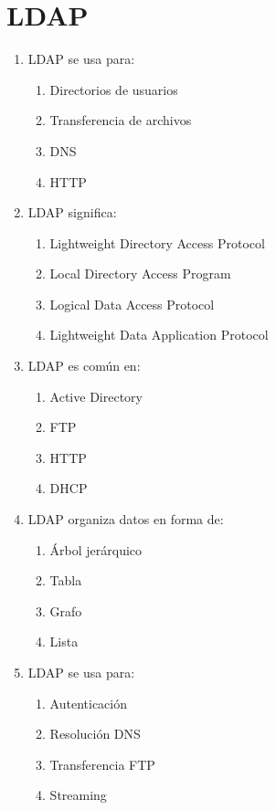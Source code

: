 \documentclass[12pt]{article}
\begin{document}
\section*{LDAP}

\begin{enumerate}[label=\textbf{LDAP-\arabic*.}]

\item LDAP se usa para:
\begin{enumerate}[label=\alph*)]
\item Directorios de usuarios
\item Transferencia de archivos
\item DNS
\item HTTP
\end{enumerate}

\item LDAP significa:
\begin{enumerate}[label=\alph*)]
\item Lightweight Directory Access Protocol
\item Local Directory Access Program
\item Logical Data Access Protocol
\item Lightweight Data Application Protocol
\end{enumerate}

\item LDAP es común en:
\begin{enumerate}[label=\alph*)]
\item Active Directory
\item FTP
\item HTTP
\item DHCP
\end{enumerate}

\item LDAP organiza datos en forma de:
\begin{enumerate}[label=\alph*)]
\item Árbol jerárquico
\item Tabla
\item Grafo
\item Lista
\end{enumerate}

\item LDAP se usa para:
\begin{enumerate}[label=\alph*)]
\item Autenticación
\item Resolución DNS
\item Transferencia FTP
\item Streaming
\end{enumerate}

\end{enumerate}
\end{document}
